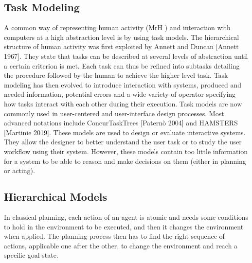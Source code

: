 \subsection{Task Modeling}

A common way of representing human activity (MrH ) and interaction with computers at a high abstraction level is by using task models. The hierarchical structure of human activity was first exploited by Annett and Duncan [Annett 1967]. They state that tasks can be described at several levels of abstraction until a certain criterion is met. Each task can thus be refined into subtasks detailing the procedure followed by the human to achieve the higher level task. Task modeling has then evolved to introduce interaction with systems, produced and needed information, potential errors and a wide variety of operator specifying how tasks interact with each other during their execution. Task models are now commonly used in user-centered and user-interface design processes. Most advanced notations include ConcurTaskTrees [Paternò 2004] and HAMSTERS [Martinie 2019]. These models are used to design or evaluate interactive systems. They allow the designer to better understand the user task or to study the user workflow using their system. However, these models contain too little information for a system to be able to reason and make decisions on them (either in planning or acting).


\subsection{Hierarchical Models}

In classical planning, each action of an agent is atomic and needs some conditions to hold in the environment to be executed, and then it changes the environment when applied. The planning process then has to find the right sequence of actions, applicable one after the other, to change the environment and reach a specific goal state. 

